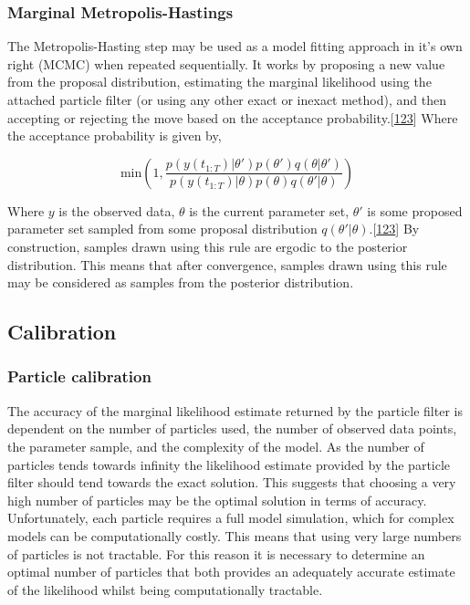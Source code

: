 \documentclass[11pt,twoside]{bristolthesis}
\begin{document}
  \hypertarget{marginal-metropolis-hastings}{%
  \subsubsection{Marginal Metropolis-Hastings}\label{marginal-metropolis-hastings}}
  
  The Metropolis-Hasting step may be used as a model fitting approach in it's own right (MCMC) when repeated sequentially. It works by proposing a new value from the proposal distribution, estimating the marginal likelihood using the attached particle filter (or using any other exact or inexact method), and then accepting or rejecting the move based on the acceptance probability.{[}\protect\hyperlink{ref-Murray2015}{123}{]} Where the acceptance probability is given by,
  
  \[ \text{min} \left(1,  \frac{p(y(t_{1:T}) |\theta')p(\theta')q(\theta | \theta')}{p(y(t_{1:T}) |\theta)p(\theta)q(\theta' | \theta)}\right) \]
  
  Where \(y\) is the observed data, \(\theta\) is the current parameter set, \(\theta'\) is some proposed parameter set sampled from some proposal distribution \(q(\theta' | \theta)\).{[}\protect\hyperlink{ref-Murray2015}{123}{]} By construction, samples drawn using this rule are ergodic to the posterior distribution. This means that after convergence, samples drawn using this rule may be considered as samples from the posterior distribution.
  
  \hypertarget{calibration}{%
  \subsection{Calibration}\label{calibration}}
  
  \hypertarget{particle-calibration}{%
  \subsubsection{Particle calibration}\label{particle-calibration}}
  
  The accuracy of the marginal likelihood estimate returned by the particle filter is dependent on the number of particles used, the number of observed data points, the parameter sample, and the complexity of the model. As the number of particles tends towards infinity the likelihood estimate provided by the particle filter should tend towards the exact solution. This suggests that choosing a very high number of particles may be the optimal solution in terms of accuracy. Unfortunately, each particle requires a full model simulation, which for complex models can be computationally costly. This means that using very large numbers of particles is not tractable. For this reason it is necessary to determine an optimal number of particles that both provides an adequately accurate estimate of the likelihood whilst being computationally tractable.
  
\end{document}
